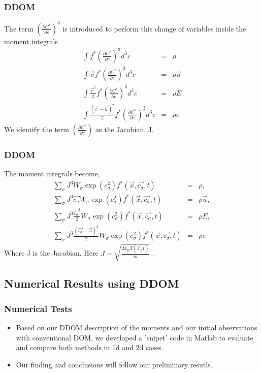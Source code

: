 \documentclass[11pt,fleqn]{beamer}
\begin{document}
\begin{frame}
	\frametitle{DDOM}
	The term $(\frac{\partial C^*}{\partial c} )^3$ is introduced to perform this change of variables inside the moment integrals
	\begin{eqnarray}
		\int f^* \left(\frac{\partial C^*}{\partial c} \right )^3 d^3 c  &=& \rho \\
		\int \vec{c} f^* \left(\frac{\partial C^*}{\partial c} \right )^3 d^3 c &=& \rho \vec{u} \nonumber \\
		\int \frac{\vec{c}^2}{2} f^* \left(\frac{\partial C^*}{\partial c} \right )^3 d^3 c  &=& \rho E \nonumber \\
		\int \frac{(\vec{c}-\vec{u})^2}{2} f^* \left(\frac{\partial C^*}{\partial c} \right )^3 d^3 c &=& \rho e \nonumber
	\end{eqnarray}
	We identify the term $\left(\frac{\partial C^*}{\partial c} \right )$ as the Jacobian, J. 
\end{frame}

\begin{frame}
	\frametitle{DDOM}
	The moment integrals become,
	\begin{eqnarray}
		\sum_\sigma J^3 W_\sigma \exp(c_\sigma^2) f^*(\vec{x},\vec{c_\sigma},t) &=&  \rho, \\
		\sum_\sigma J^3 \vec{c_\sigma} W_\sigma \exp(c_\sigma^2) f^*(\vec{x},\vec{c_\sigma},t)&=& \rho \vec{u}, \nonumber \\
		\sum_\sigma J^3 \frac{\vec{c_\sigma}^2}{2} W_\sigma \exp(c_\sigma^2) f^*(\vec{x},\vec{c_\sigma},t)&=& \rho E, \nonumber \\
		\sum_\sigma J^3 \frac{(\vec{c_\sigma}-\vec{u})^2}{2} W_\sigma \exp(c_\sigma^2) f^*(\vec{x},\vec{c_\sigma},t) &=& \rho e  \nonumber
	\end{eqnarray}
	Where J is the Jacobian. Here $J = \sqrt{\frac{2k_B T(\vec{x},t)}{m}}$ .
\end{frame}

\subsection{Numerical Results using DDOM}
\begin{frame}
	\frametitle{Numerical Tests}
	\begin{itemize}
	\item Based on our DDOM description of the moments and our initial observations with conventional DOM, we developed a 'snipet' code in Matlab to evaluate and compare both methods in 1d and 2d cases.
	\item Our finding and conclusions will follow our preliminary resutls.
	\end{itemize}	
\end{frame}
\end{document}
